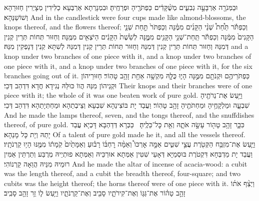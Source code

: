 {%
{וּבַמְּנֹרָ֖ה אַרְבָּעָ֣ה גְבִעִ֑ים מְשֻׁ֨קָּדִ֔ים כַּפְתֹּרֶ֖יהָ וּפְרָחֶֽיהָ׃}
{וּבִמְנָרְתָא אַרְבְּעָא כַלִּידִין מְצָיְרִין חַזּוּרַהָא וְשׁוֹשַׁנַּהָא׃}
{And in the candlestick were four cups made like almond-blossoms, the knops thereof, and the flowers thereof;}{}
{וְכַפְתֹּ֡ר תַּ֩חַת֩ שְׁנֵ֨י הַקָּנִ֜ים מִמֶּ֗נָּה וְכַפְתֹּר֙ תַּ֣חַת שְׁנֵ֤י הַקָּנִים֙ מִמֶּ֔נָּה וְכַפְתֹּ֕ר תַּֽחַת־שְׁנֵ֥י הַקָּנִ֖ים מִמֶּ֑נָּה לְשֵׁ֙שֶׁת֙ הַקָּנִ֔ים הַיֹּצְאִ֖ים מִמֶּֽנָּה׃}
{וְחַזּוּר תְּחוֹת תְּרֵין קְנִין דְּמִנַּהּ וְחַזּוּר תְּחוֹת תְּרֵין קְנִין דְּמִנַּהּ וְחַזּוּר תְּחוֹת תְּרֵין קְנִין דְּמִנַּהּ לְשִׁתָּא קְנִין דְּנָפְקִין מִנַּהּ׃}
{and a knop under two branches of one piece with it, and a knop under two branches of one piece with it, and a knop under two branches of one piece with it, for the six branches going out of it.}{}
{כַּפְתֹּרֵיהֶ֥ם וּקְנֹתָ֖ם מִמֶּ֣נָּה הָי֑וּ כֻּלָּ֛הּ מִקְשָׁ֥ה אַחַ֖ת זָהָ֥ב טָהֽוֹר׃}
{חַזּוּרֵיהוֹן וּקְנֵיהוֹן מִנַּהּ הֲווֹ כּוּלַּהּ נְגִידָא חֲדָא דִּדְהַב דְּכֵי׃}
{Their knops and their branches were of one piece with it; the whole of it was one beaten work of pure gold.}{}
{וַיַּ֥עַשׂ אֶת־נֵרֹתֶ֖יהָ שִׁבְעָ֑ה וּמַלְקָחֶ֥יהָ וּמַחְתֹּתֶ֖יהָ זָהָ֥ב טָהֽוֹר׃}
{וַעֲבַד יָת בּוֹצִינַהָא שִׁבְעָא וְצֵיבְתַהָא וּמַחְתְּיָתַהָא דִּדְהַב דְּכֵי׃}
{And he made the lamps thereof, seven, and the tongs thereof, and the snuffdishes thereof, of pure gold.}{}
{כִּכָּ֛ר זָהָ֥ב טָה֖וֹר עָשָׂ֣ה אֹתָ֑הּ וְאֵ֖ת כׇּל־כֵּלֶֽיהָ׃ \petucha }
{כַּכְּרָא דְּדַהְבָּא דָּכְיָא עֲבַד יָתַהּ וְיָת כָּל מָנַהָא׃}
{Of a talent of pure gold made he it, and all the vessels thereof.}{}
{וַיַּ֛עַשׂ אֶת־מִזְבַּ֥ח הַקְּטֹ֖רֶת עֲצֵ֣י שִׁטִּ֑ים אַמָּ֣ה אׇרְכּוֹ֩ וְאַמָּ֨ה רׇחְבּ֜וֹ רָב֗וּעַ וְאַמָּתַ֙יִם֙ קֹֽמָת֔וֹ מִמֶּ֖נּוּ הָי֥וּ קַרְנֹתָֽיו׃}
{וַעֲבַד יָת מַדְבְּחָא דִּקְטֹרֶת בּוּסְמַיָּא דְּאָעֵי שִׁטִּין אַמְּתָא אוּרְכֵּיהּ וְאַמְּתָא פוּתְיֵיהּ מְרֻבַּע וְתַרְתֵּין אַמִּין רוּמֵיהּ מִנֵּיהּ הֲוַאָה קַרְנוֹהִי׃}
{And he made the altar of incense of acacia-wood: a cubit was the length thereof, and a cubit the breadth thereof, four-square; and two cubits was the height thereof; the horns thereof were of one piece with it.}{}
{וַיְצַ֨ף אֹת֜וֹ זָהָ֣ב טָה֗וֹר אֶת־גַּגּ֧וֹ וְאֶת־קִירֹתָ֛יו סָבִ֖יב וְאֶת־קַרְנֹתָ֑יו וַיַּ֥עַשׂ ל֛וֹ זֵ֥ר זָהָ֖ב סָבִֽיב׃}
}
